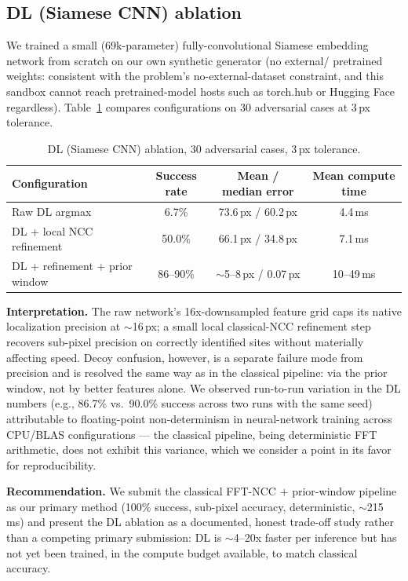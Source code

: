 \documentclass[11pt]{article}
\begin{document}
\subsection{DL (Siamese CNN) ablation}

We trained a small (69k-parameter) fully-convolutional Siamese embedding
network from scratch on our own synthetic generator (no external/
pretrained weights: consistent with the problem's no-external-dataset
constraint, and this sandbox cannot reach pretrained-model hosts such as
torch.hub or Hugging Face regardless). Table~\ref{tab:dl} compares
configurations on 30 adversarial cases at 3\,px tolerance.

\begin{table}[H]
\centering
\caption{DL (Siamese CNN) ablation, 30 adversarial cases, 3\,px tolerance.}
\label{tab:dl}
\begin{tabular}{lccc}
\toprule
Configuration & Success rate & Mean / median error & Mean compute time \\
\midrule
Raw DL argmax & 6.7\% & 73.6\,px / 60.2\,px & 4.4\,ms \\
DL + local NCC refinement & 50.0\% & 66.1\,px / 34.8\,px & 7.1\,ms \\
DL + refinement + prior window & 86--90\% & $\sim$5--8\,px / 0.07\,px & 10--49\,ms \\
\bottomrule
\end{tabular}
\end{table}

\textbf{Interpretation.} The raw network's 16x-downsampled feature grid
caps its native localization precision at $\sim$16\,px; a small local
classical-NCC refinement step recovers sub-pixel precision on correctly
identified sites without materially affecting speed. Decoy confusion,
however, is a separate failure mode from precision and is resolved the
same way as in the classical pipeline: via the prior window, not by
better features alone. We observed run-to-run variation in the DL
numbers (e.g., 86.7\% vs.\ 90.0\% success across two runs with the same
seed) attributable to floating-point non-determinism in neural-network
training across CPU/BLAS configurations --- the classical pipeline, being
deterministic FFT arithmetic, does not exhibit this variance, which we
consider a point in its favor for reproducibility.

\textbf{Recommendation.} We submit the classical FFT-NCC \(+\) prior-window
pipeline as our primary method (100\% success, sub-pixel accuracy,
deterministic, $\sim$215\,ms) and present the DL ablation as a documented,
honest trade-off study rather than a competing primary submission: DL is
$\sim$4--20x faster per inference but has not yet been trained, in the
compute budget available, to match classical accuracy.
\end{document}
